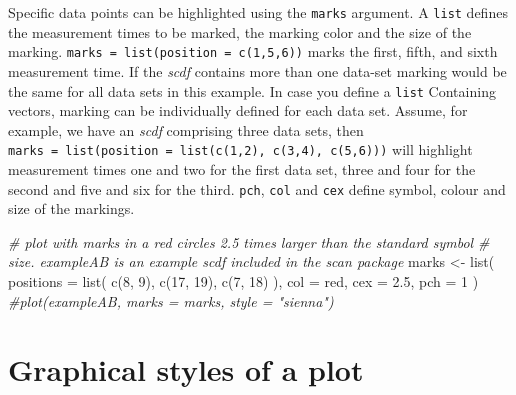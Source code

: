 \documentclass[
]{book}
\newenvironment{Shaded}{\begin{snugshade}}{\end{snugshade}}
\newcommand{\AttributeTok}[1]{\textcolor[rgb]{0.77,0.63,0.00}{#1}}
\newcommand{\CommentTok}[1]{\textcolor[rgb]{0.56,0.35,0.01}{\textit{#1}}}
\newcommand{\DecValTok}[1]{\textcolor[rgb]{0.00,0.00,0.81}{#1}}
\newcommand{\FloatTok}[1]{\textcolor[rgb]{0.00,0.00,0.81}{#1}}
\newcommand{\FunctionTok}[1]{\textcolor[rgb]{0.00,0.00,0.00}{#1}}
\newcommand{\NormalTok}[1]{#1}
\newcommand{\OtherTok}[1]{\textcolor[rgb]{0.56,0.35,0.01}{#1}}
\newcommand{\StringTok}[1]{\textcolor[rgb]{0.31,0.60,0.02}{#1}}
\begin{document}
Specific data points can be highlighted using the \texttt{marks} argument. A \texttt{list} defines the measurement times to be marked, the marking color and the size of the marking. \texttt{marks\ =\ list(position\ =\ c(1,5,6))} marks the first, fifth, and sixth measurement time. If the \emph{scdf} contains more than one data-set marking would be the same for all data sets in this example. In case you define a \texttt{list} Containing vectors, marking can be individually defined for each data set. Assume, for example, we have an \emph{scdf} comprising three data sets, then \texttt{marks\ =\ list(position\ =\ list(c(1,2),\ c(3,4),\ c(5,6)))} will highlight measurement times one and two for the first data set, three and four for the second and five and six for the third. \texttt{pch}, \texttt{col} and \texttt{cex} define symbol, colour and size of the markings.

\begin{Shaded}
\begin{Highlighting}[]
\CommentTok{\# plot with marks in a red circles 2.5 times larger than the standard symbol }
\CommentTok{\# size. exampleAB is an example scdf included in the scan package}
\NormalTok{marks }\OtherTok{\textless{}{-}} \FunctionTok{list}\NormalTok{(}
  \AttributeTok{positions =} \FunctionTok{list}\NormalTok{( }\FunctionTok{c}\NormalTok{(}\DecValTok{8}\NormalTok{, }\DecValTok{9}\NormalTok{), }\FunctionTok{c}\NormalTok{(}\DecValTok{17}\NormalTok{, }\DecValTok{19}\NormalTok{), }\FunctionTok{c}\NormalTok{(}\DecValTok{7}\NormalTok{, }\DecValTok{18}\NormalTok{) ), }
  \AttributeTok{col =} \StringTok{\textquotesingle{}red\textquotesingle{}}\NormalTok{, }\AttributeTok{cex =} \FloatTok{2.5}\NormalTok{, }\AttributeTok{pch =} \DecValTok{1}
\NormalTok{)}
\CommentTok{\#plot(exampleAB, marks = marks, style = "sienna")}
\end{Highlighting}
\end{Shaded}

\hypertarget{graphical-styles-of-a-plot}{%
\section{Graphical styles of a plot}\label{graphical-styles-of-a-plot}}
\end{document}
